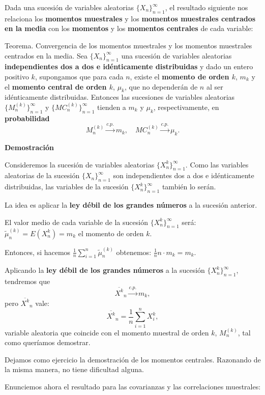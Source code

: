\documentclass[]{book}
\begin{document}
Dada una sucesión de variables aleatorias \(\{X_n\}_{n=1}^\infty\), el resultado siguiente nos relaciona los \textbf{momentos muestrales} y los \textbf{momentos muestrales centrados en la media} con los \textbf{momentos} y los \textbf{momentos centrales} de cada variable:

Teorema. Convergencia de los momentos muestrales y los momentos muestrales centrados en la media.
Sea \(\{X_n\}_{n=1}^\infty\) una sucesión de variables aleatorias \textbf{independientes dos a dos e idénticamente distribuidas} y dado un entero positivo \(k\), supongamos que para cada \(n\), existe el \textbf{momento de orden \(k\)}, \(m_k\) y el \textbf{momento central de orden \(k\)}, \(\mu_k\), que no dependerán de \(n\) al ser idénticamente distribuidas. Entonces las sucesiones de variables aleatorias \(\{M_n^{(k)}\}_{n=1}^\infty\) y \(\{MC_n^{(k)}\}_{n=1}^\infty\) tienden a \(m_k\) y \(\mu_k\), respectivamente, en \textbf{probabilidad}
\[
M_n^{(k)}\stackrel{c.p.}{\longrightarrow} m_k,\quad MC_n^{(k)}\stackrel{c.p.}{\longrightarrow} \mu_k.
\]

\textbf{Demostración}

Consideremos la sucesión de variables aleatorias \(\{X_n^k\}_{n=1}^\infty\). Como las variables aleatorias de la sucesión \(\{X_n\}_{n=1}^\infty\) son independientes dos a dos e idénticamente distribuidas, las variables de la sucesión \(\{X_n^k\}_{n=1}^\infty\) también lo serán.

La idea es aplicar la \textbf{ley débil de los grandes números} a la sucesión anterior.

El valor medio de cada variable de la sucesión \(\{X_n^k\}_{n=1}^\infty\) será: \(\tilde{\mu}_n^{(k)}= E(X_n^{k})=m_k\) el momento de orden \(k\).

Entonces, si hacemos \(\frac{1}{n}\sum\limits_{i=1}^n \tilde{\mu}_n^{(k)}\) obtenemos:
\(\frac{1}{n} n\cdot m_k=m_k.\)

Aplicando la \textbf{ley débil de los grandes números} a la sucesión \(\{X_n^k\}_{n=1}^\infty\), tendremos que
\[
\overline{X^k}_n \stackrel{c.p.}{\longrightarrow}m_k,
\]
pero \(\overline{X^k}_n\) vale:
\[
\overline{X^k}_n=\frac{1}{n}\sum_{i=1}^n X_i^k,
\]
variable aleatoria que coincide con el momento muestral de orden \(k\), \(M_n^{(k)}\), tal como queríamos demostrar.

Dejamos como ejercicio la demostración de los momentos centrales. Razonando de la misma manera, no tiene dificultad alguna.

Enunciemos ahora el resultado para las covarianzas y las correlaciones muestrales:
\end{document}
